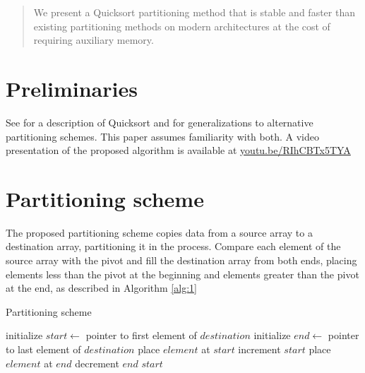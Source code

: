 \documentclass{juliacon}
\begin{document}


\maketitle

\begin{abstract}



We present a Quicksort partitioning method that is stable and faster than existing partitioning methods on modern architectures at the cost of requiring auxiliary memory.

\end{abstract}

\section{Preliminaries}

See \cite{quicksort} for a description of Quicksort and \cite{lomuto} for generalizations to alternative partitioning schemes. This paper assumes familiarity with both. A video presentation of the proposed algorithm is available at \href{https://youtu.be/RIhCBTx5TYA}{youtu.be/RIhCBTx5TYA}

\section{Partitioning scheme}

The proposed partitioning scheme copies data from a source array to a destination array, partitioning it in the process. Compare each element of the source array with the pivot and fill the destination array from both ends, placing elements less than the pivot at the beginning and elements greater than the pivot at the end, as described in Algorithm \ref{alg:1}

\vspace{-5pt}

\begin{algorithm}[h]
\caption{Partitioning scheme}\label{alg:1}
\begin{algorithmic}[1]
    \State initialize $start \leftarrow$ pointer to first element of $destination$
    \State initialize $end \leftarrow$ pointer to last element of $destination$
        \State place $element$ at $start$
        \State increment $start$
      \Else
        \State place $element$ at $end$
        \State decrement $end$
      \EndIf
    \EndFor
    \State \Return $start$
  \EndProcedure
\end{algorithmic}
\end{algorithm}
\end{document}
